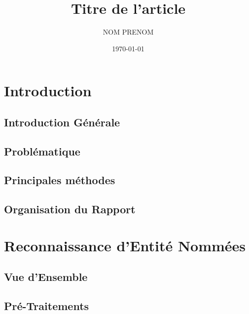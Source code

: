 \documentclass[11pt,a4paper]{report}
\title{Titre de l'article}
\date{\today}
\author{NOM PRENOM}
\begin{document}



%	

%	


\tableofcontents
%	



\chapter{Introduction}
	\section{Introduction Générale}
		
	\section{Problématique}
		
	\section{Principales méthodes}
		
	\section{Organisation du Rapport}
		

  	
\chapter{Reconnaissance d'Entité Nommées}
	\section{Vue d'Ensemble}
		
	\section{Pré-Traitements}
\end{document}
